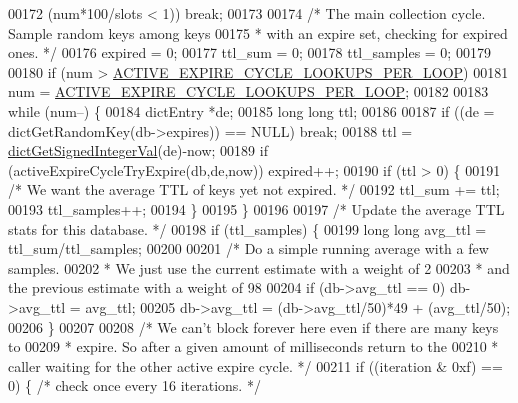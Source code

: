 \begin{DoxyCode}
{{00172                 (num*100/slots < 1)) \textcolor{keywordflow}{break};
00173 
00174             \textcolor{comment}{/* The main collection cycle. Sample random keys among keys}
00175 \textcolor{comment}{             * with an expire set, checking for expired ones. */}
00176             expired = 0;
00177             ttl\_sum = 0;
00178             ttl\_samples = 0;
00179 
00180             \textcolor{keywordflow}{if} (num > \hyperlink{server_8h_a85d8b4e82684730649464046a4a00be2}{ACTIVE\_EXPIRE\_CYCLE\_LOOKUPS\_PER\_LOOP})
00181                 num = \hyperlink{server_8h_a85d8b4e82684730649464046a4a00be2}{ACTIVE\_EXPIRE\_CYCLE\_LOOKUPS\_PER\_LOOP};
00182 
00183             \textcolor{keywordflow}{while} (num--) \{
00184                 dictEntry *de;
00185                 \textcolor{keywordtype}{long} \textcolor{keywordtype}{long} ttl;
00186 
00187                 \textcolor{keywordflow}{if} ((de = dictGetRandomKey(db->expires)) == NULL) \textcolor{keywordflow}{break};
00188                 ttl = \hyperlink{dict_8h_a31f34bf34a743e3ebf122fa231b28d57}{dictGetSignedIntegerVal}(de)-now;
00189                 \textcolor{keywordflow}{if} (activeExpireCycleTryExpire(db,de,now)) expired++;
00190                 \textcolor{keywordflow}{if} (ttl > 0) \{
00191                     \textcolor{comment}{/* We want the average TTL of keys yet not expired. */}
00192                     ttl\_sum += ttl;
00193                     ttl\_samples++;
00194                 \}
00195             \}
00196 
00197             \textcolor{comment}{/* Update the average TTL stats for this database. */}
00198             \textcolor{keywordflow}{if} (ttl\_samples) \{
00199                 \textcolor{keywordtype}{long} \textcolor{keywordtype}{long} avg\_ttl = ttl\_sum/ttl\_samples;
00200 
00201                 \textcolor{comment}{/* Do a simple running average with a few samples.}
00202 \textcolor{comment}{                 * We just use the current estimate with a weight of 2%
00203 \textcolor{comment}{                 * and the previous estimate with a weight of 98%
00204                 \textcolor{keywordflow}{if} (db->avg\_ttl == 0) db->avg\_ttl = avg\_ttl;
00205                 db->avg\_ttl = (db->avg\_ttl/50)*49 + (avg\_ttl/50);
00206             \}
00207 
00208             \textcolor{comment}{/* We can't block forever here even if there are many keys to}
00209 \textcolor{comment}{             * expire. So after a given amount of milliseconds return to the}
00210 \textcolor{comment}{             * caller waiting for the other active expire cycle. */}
00211             \textcolor{keywordflow}{if} ((iteration & 0xf) == 0) \{ \textcolor{comment}{/* check once every 16 iterations. */}
}}}}
\end{DoxyCode}
